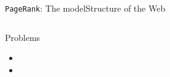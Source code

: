 \documentclass[xcolor=table,final]{beamer} %
\newcommand{\PageRank}{\texttt{PageRank}\xspace}
\begin{document}
\begin{frame}{\PageRank : The model}{Structure of the Web}
\begin{columns}
    \pause
    \begin{block}{\alert{Problems}}
      \begin{itemize}
      \item {} %
      \item {} %
      \end{itemize}
    \end{block}
  \end{columns}
\end{frame}
\end{document}

